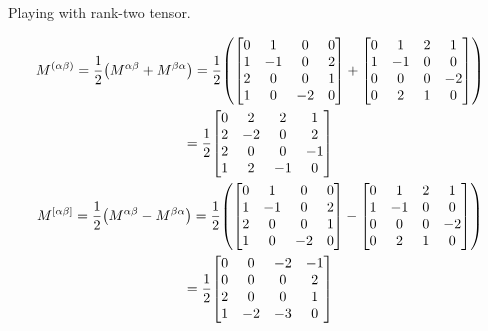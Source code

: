 \documentclass{report}
\begin{document}
\begin{subquests}
\begin{subquests}
		\item	
	\end{subquests}

	\item {Playing with rank-two tensor.}
	\begin{subquests}
		\item
		\begin{subquests}
			\item
			\begin{gather*}
				M^{\pqty{\alpha \beta}} = \frac{1}{2}\pqty{M^{\alpha \beta} + M^{\beta \alpha}} = \frac{1}{2} \pqty{
				\mqty[
					0 & 1 & 0 & 0 \\
					1 & -1 & 0 & 2 \\
					2 & 0 & 0 & 1 \\
					1 & 0 & -2 & 0
				]
				+
				\mqty[
					0 & 1 & 2 & 1 \\
					1 & -1 & 0 & 0 \\
					0 & 0 & 0 & -2 \\
					0 & 2 & 1 & 0 \\
				]} \\
				= \frac{1}{2}
				\mqty[
					0 & 2 & 2 & 1 \\
					2 & -2 & 0 & 2 \\
					2 & 0 & 0 & -1 \\
					1 & 2 & -1 & 0
				] \\
				M^{\bqty{\alpha \beta}} = \frac{1}{2}\pqty{M^{\alpha \beta} - M^{\beta \alpha}} = \frac{1}{2} \pqty{
				\mqty[
					0 & 1 & 0 & 0 \\
					1 & -1 & 0 & 2 \\
					2 & 0 & 0 & 1 \\
					1 & 0 & -2 & 0
				]
				-
				\mqty[
					0 & 1 & 2 & 1 \\
					1 & -1 & 0 & 0 \\
					0 & 0 & 0 & -2 \\
					0 & 2 & 1 & 0 \\
				]} \\
				= \frac{1}{2}
				\mqty[
					0 & 0 & -2 & -1 \\
					0 & 0 & 0 & 2 \\
					2 & 0 & 0 & 1 \\
					1 & -2 & -3 & 0
				]
			\end{gather*}
			

\end{subquests}
\end{subquests}
\end{subquests}
\end{document}
